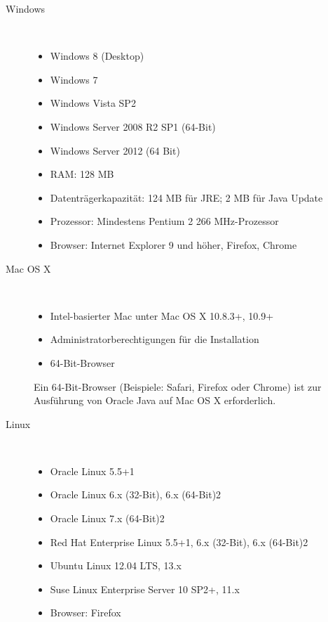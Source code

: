 \begin{description}
   \item[Windows]~\par
   \begin{itemize}

    \item Windows 8 (Desktop)
    \item Windows 7
    \item Windows Vista SP2
    \item Windows Server 2008 R2 SP1 (64-Bit)
    \item Windows Server 2012 (64 Bit)
    \item RAM: 128 MB
    \item Datenträgerkapazität: 124 MB für JRE; 2 MB für Java Update
    \item Prozessor: Mindestens Pentium 2 266 MHz-Prozessor
    \item Browser: Internet Explorer 9 und höher, Firefox, Chrome
   \end{itemize}
   
      \item[Mac OS X]~\par
      \begin{itemize}
    \item Intel-basierter Mac unter Mac OS X 10.8.3+, 10.9+
    \item Administratorberechtigungen für die Installation
    \item 64-Bit-Browser
      \end{itemize}
      
      Ein 64-Bit-Browser (Beispiele: Safari, Firefox oder Chrome) ist zur Ausführung von Oracle Java auf Mac OS X erforderlich.
      
   \item[Linux]~\par
   \begin{itemize}

    \item Oracle Linux 5.5+1
    \item Oracle Linux 6.x (32-Bit), 6.x (64-Bit)2
    \item Oracle Linux 7.x (64-Bit)2
    \item Red Hat Enterprise Linux 5.5+1, 6.x (32-Bit), 6.x (64-Bit)2
    \item Ubuntu Linux 12.04 LTS, 13.x
    \item Suse Linux Enterprise Server 10 SP2+, 11.x
    \item Browser: Firefox

   \end{itemize}
      
   
\end{description}